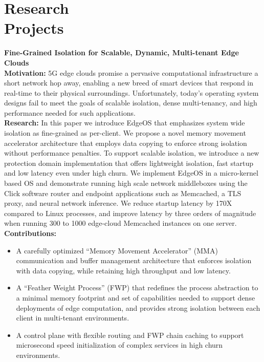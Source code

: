 \section{Research\\Projects}
\textbf{Fine-Grained Isolation for Scalable, Dynamic, Multi-tenant Edge Clouds}
\\
\textbf{\small Motivation:}
5G edge clouds promise a pervasive computational infrastructure a short network hop away, enabling a new breed of smart devices that respond in real-time to their physical surroundings.
Unfortunately, today’s operating system designs fail to meet the goals of scalable isolation, dense multi-tenancy, and high performance needed for such applications.
\\
\textbf{\small Research:}
In this paper we introduce EdgeOS that emphasizes system wide isolation as fine-grained as per-client.
We propose a novel memory movement accelerator architecture that employs data copying to enforce strong isolation without performance penalties.
To support scalable isolation, we introduce a new protection domain implementation that offers lightweight isolation, fast startup and low latency even under high churn.
We implement EdgeOS in a micro-kernel based OS and demonstrate running high scale network middleboxes using the Click software router and endpoint applications such as Memcached, a TLS proxy, and neural network inference.
We reduce startup latency by 170X compared to Linux processes, and improve latency by three orders of magnitude when running 300 to 1000 edge-cloud Memcached instances on one server.
\\
\textbf{\small Contributions:}
\begin{itemize}[leftmargin=*]
  \setlength\itemsep{-0.0em}
        \item A carefully optimized “Memory Movement Accelerator” (MMA) communication and buffer management architecture that enforces isolation with data copying, while retaining high throughput and low latency.
        \item A “Feather Weight Process” (FWP) that redefines the process abstraction to a minimal memory footprint and set of capabilities needed to support dense deployments of edge computation, and provides strong isolation between each client in multi-tenant environments.
        \item A control plane with flexible routing and FWP chain caching to support microsecond speed initialization of complex services in high churn environments.
\end{itemize}
